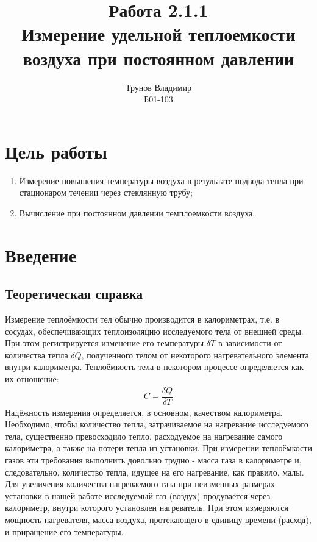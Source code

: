 \documentclass[a4paper, 12pt]{article}%
\author{Трунов Владимир \\
Б01-103
\vspace*{17 cm}}
\title{\textbf{Работа 2.1.1 \\ 
Измерение удельной теплоемкости воздуха при постоянном давлении}}
\begin{document}
\maketitle

\newpage

\section*{Цель работы}
\begin{enumerate}
\item Измерение повышения температуры воздуха в результате подвода тепла при стационаром течении через стеклянную трубу;
\item Вычисление при постоянном давлении темплоемкости воздуха.
\end{enumerate}
\section*{Введение}
\subsection*{Теоретическая справка}
Измерение теплоёмкости тел обычно производится в калориметрах, т.е. в сосудах, обеспечивающих теплоизоляцию исследуемого тела от внешней среды. При этом регистрируется изменение его температуры $\delta T$ в зависимости от количества тепла $\delta Q$, полученного телом от некоторого нагревательного элемента внутри калориметра. Теплоёмкость тела в некотором процессе определяется как их отношение:
\begin{equation}
\begin{aligned}
C = \dfrac{\delta Q}{\delta T} 
\end{aligned}
\end{equation}
Надёжность измерения определяется, в основном, качеством калориметра. Необходимо, чтобы количество тепла, затрачиваемое на нагревание исследуемого тела, существенно превосходило тепло, расходуемое на нагревание самого калориметра, а также на потери тепла из установки. При измерении теплоёмкости газов эти требования выполнить довольно трудно - масса газа в калориметре и, следовательно, количество тепла, идущее на его нагревание, как правило, малы. Для увеличения количества нагреваемого газа при неизменных размерах установки в нашей работе исследуемый газ (воздух) продувается через калориметр, внутри которого установлен нагреватель. При этом измеряются мощность нагревателя, масса воздуха, протекающего в единицу времени (расход), и приращение его температуры.
\end{document}
